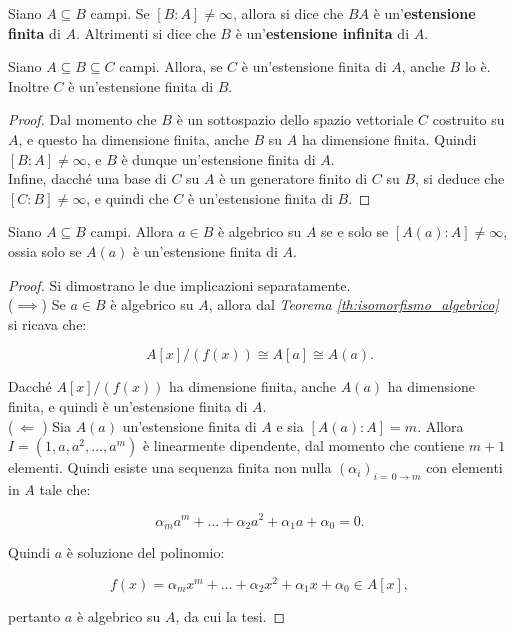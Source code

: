 \begin{definition}
    Siano $A \subseteq B$ campi. Se $[B : A] \neq \infty$, allora
    si dice che $BA$ è un'\textbf{estensione finita} di $A$.
    Altrimenti si dice che $B$ è un'\textbf{estensione infinita}
    di $A$.
\end{definition}

\begin{proposition}
    \label{prop:estensione_finita}
    Siano $A \subseteq B \subseteq C$ campi. Allora, se $C$ è
    un'estensione finita di $A$, anche $B$ lo è. Inoltre
    $C$ è un'estensione finita di $B$.
\end{proposition}

\begin{proof}
    Dal momento che $B$ è un sottospazio dello spazio vettoriale
    $C$ costruito su $A$, e questo ha dimensione finita,
    anche $B$ su $A$ ha dimensione finita. Quindi $[B : A] \neq
        \infty$, e $B$ è dunque un'estensione finita di $A$. \\

    Infine, dacché una base di $C$ su $A$ è un generatore finito
    di $C$ su $B$, si deduce che $[C : B] \neq \infty$, e quindi
    che $C$ è un'estensione finita di $B$.
\end{proof}

\begin{theorem}
    \label{th:estensione_algebrica}
    Siano $A \subseteq B$ campi. Allora $a \in B$ è
    algebrico su $A$ se e solo se $[A(a) : A] \neq \infty$,
    ossia solo se $A(a)$ è un'estensione finita di $A$.
\end{theorem}

\begin{proof} Si dimostrano le due implicazioni separatamente. \\

    ($\implies$)\; Se $a \in B$ è algebrico su $A$, allora
    dal \textit{Teorema \ref{th:isomorfismo_algebrico}} si ricava che:

    \[ A[x]/(f(x)) \cong A[a] \cong A(a). \]

    \vskip 0.1in

    Dacché $A[x]/(f(x))$ ha dimensione finita, anche $A(a)$
    ha dimensione finita, e quindi è un'estensione finita
    di $A$. \\

    ($\,\Longleftarrow\,\,$)\; Sia $A(a)$ un'estensione
    finita di $A$ e sia $[A(a) : A]=m$. Allora $I=(1, a, a^2, \ldots, a^m)$ è linearmente dipendente, dal momento che contiene
    $m+1$ elementi. Quindi esiste una sequenza finita non nulla
    $(\alpha_i)_{i=\,0\to m}$ con elementi in $A$ tale che:

    \[ \alpha_m a^m + \ldots + \alpha_2 a^2 + \alpha_1 a + \alpha_0 = 0. \]

    Quindi $a$ è soluzione del polinomio:

    \[ f(x) = \alpha_m x^m + \ldots + \alpha_2 x^2 + \alpha_1 x + \alpha_0 \in A[x], \]

    \vskip 0.1in

    pertanto $a$ è algebrico su $A$, da cui la tesi.
\end{proof}


